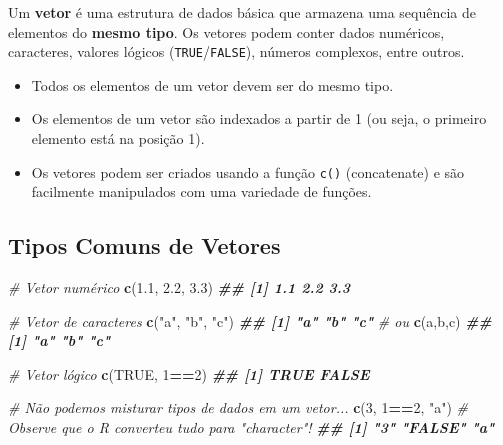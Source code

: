 \documentclass[
]{book}
\newenvironment{Shaded}{\begin{snugshade}}{\end{snugshade}}
\newcommand{\CommentTok}[1]{\textcolor[rgb]{0.56,0.35,0.01}{\textit{#1}}}
\newcommand{\ConstantTok}[1]{\textcolor[rgb]{0.56,0.35,0.01}{#1}}
\newcommand{\DecValTok}[1]{\textcolor[rgb]{0.00,0.00,0.81}{#1}}
\newcommand{\DocumentationTok}[1]{\textcolor[rgb]{0.56,0.35,0.01}{\textbf{\textit{#1}}}}
\newcommand{\FloatTok}[1]{\textcolor[rgb]{0.00,0.00,0.81}{#1}}
\newcommand{\FunctionTok}[1]{\textcolor[rgb]{0.13,0.29,0.53}{\textbf{#1}}}
\newcommand{\NormalTok}[1]{#1}
\newcommand{\SpecialCharTok}[1]{\textcolor[rgb]{0.81,0.36,0.00}{\textbf{#1}}}
\newcommand{\StringTok}[1]{\textcolor[rgb]{0.31,0.60,0.02}{#1}}
\providecommand{\tightlist}{%
  \setlength{\itemsep}{0pt}\setlength{\parskip}{0pt}}
\begin{document}
Um \textbf{vetor} é uma estrutura de dados básica que armazena uma sequência
de elementos do \textbf{mesmo tipo}. Os vetores podem conter dados numéricos,
caracteres, valores lógicos (\texttt{TRUE}/\texttt{FALSE}), números complexos, entre
outros.

\begin{itemize}
\tightlist
\item
  Todos os elementos de um vetor devem ser do mesmo tipo.
\item
  Os elementos de um vetor são indexados a partir de 1 (ou seja, o
  primeiro elemento está na posição 1).
\item
  Os vetores podem ser criados usando a função \texttt{c()} (concatenate) e
  são facilmente manipulados com uma variedade de funções.
\end{itemize}

\subsection{Tipos Comuns de Vetores}\label{tipos-comuns-de-vetores}

\begin{Shaded}
\begin{Highlighting}[]
\CommentTok{\# Vetor numérico}
\FunctionTok{c}\NormalTok{(}\FloatTok{1.1}\NormalTok{, }\FloatTok{2.2}\NormalTok{, }\FloatTok{3.3}\NormalTok{)}
\DocumentationTok{\#\# [1] 1.1 2.2 3.3}

\CommentTok{\# Vetor de caracteres}
\FunctionTok{c}\NormalTok{(}\StringTok{"a"}\NormalTok{, }\StringTok{"b"}\NormalTok{, }\StringTok{"c"}\NormalTok{)}
\DocumentationTok{\#\# [1] "a" "b" "c"}
\CommentTok{\# ou}
\FunctionTok{c}\NormalTok{(}\StringTok{\textquotesingle{}a\textquotesingle{}}\NormalTok{,}\StringTok{\textquotesingle{}b\textquotesingle{}}\NormalTok{,}\StringTok{\textquotesingle{}c\textquotesingle{}}\NormalTok{)}
\DocumentationTok{\#\# [1] "a" "b" "c"}

\CommentTok{\# Vetor lógico}
\FunctionTok{c}\NormalTok{(}\ConstantTok{TRUE}\NormalTok{, }\DecValTok{1}\SpecialCharTok{==}\DecValTok{2}\NormalTok{)}
\DocumentationTok{\#\# [1]  TRUE FALSE}

\CommentTok{\# Não podemos misturar tipos de dados em um vetor...}
\FunctionTok{c}\NormalTok{(}\DecValTok{3}\NormalTok{, }\DecValTok{1}\SpecialCharTok{==}\DecValTok{2}\NormalTok{, }\StringTok{"a"}\NormalTok{) }\CommentTok{\# Observe que o R converteu tudo para "character"!}
\DocumentationTok{\#\# [1] "3"     "FALSE" "a"}
\end{Highlighting}
\end{Shaded}
\end{document}
